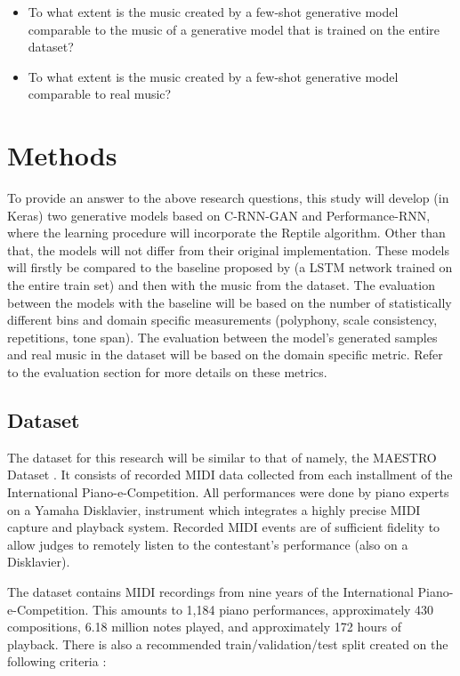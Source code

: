 \documentclass[a4paper]{book}
\begin{document}
\begin{itemize}
    \item To what extent is the music created by a few-shot generative model comparable to the music of a generative model that is trained on the entire dataset?
    \item To what extent is the music created by a few-shot generative model comparable to real music?

\end{itemize}

\chapter{Methods}\label{chap:methods}

To provide an answer to the above research questions, this study will develop (in Keras) two generative models based on C-RNN-GAN and Performance-RNN, where the learning procedure will incorporate the Reptile algorithm. Other than that, the models will not differ from their original implementation. These models will firstly be compared to the baseline proposed by \textcite{larochelle_few-shot_2017} (a LSTM network trained on the entire train set) and then with the music from the dataset. The evaluation between the models with the baseline will be based on the number of statistically different bins \parencite[NDB;][]{richardson_gans_2018} and domain specific measurements (polyphony, scale consistency, repetitions, tone span). The evaluation between the model's generated samples and real music in the dataset will be based on the domain specific metric. Refer to the evaluation section for more details on these metrics.

\section{Dataset}

The dataset for this research will be similar to that of \parencite{oore_this_2018} namely, the MAESTRO Dataset \parencite{hawthorne_enabling_2018}. It consists of recorded MIDI data collected from each installment of the International Piano-e-Competition. All performances were done by piano experts on a Yamaha Disklavier, instrument which integrates a highly precise MIDI capture and playback system. Recorded MIDI events are of sufficient fidelity to allow judges to remotely listen to the contestant's performance (also on a Disklavier).

The dataset contains MIDI recordings from nine years of the International Piano-e-Competition. This amounts to 1,184 piano performances, approximately 430 compositions, 6.18 million notes played, and approximately 172 hours of playback. There is also a recommended train/validation/test split created on the following criteria \parencite{hawthorne_enabling_2018}:
\end{document}
